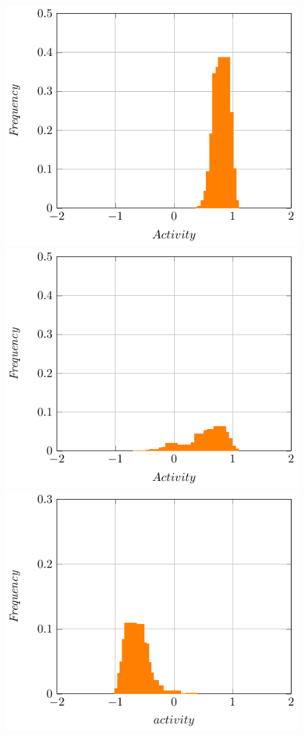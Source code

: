 \begin{figure}[H]
\centering
\includegraphics[scale=0.85]{images/init.pdf}
\includegraphics[scale=0.85]{images/mid.pdf}
\includegraphics[scale=0.9]{images/histoact.pdf}

\end{figure}
